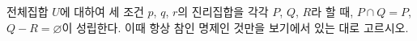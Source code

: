 전체집합 $U$에 대하여 세 조건 $p$, $q$, $r$의 진리집합을 각각 $P$, $Q$, $R$라 할 때, $P\cap Q=P$, $Q-R=\varnothing$이 성립한다. 이때 항상 참인 명제인 것만을 보기에서 있는 대로 고르시오. 
